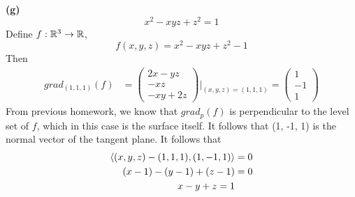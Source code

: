 \documentclass[a4paper, 12pt]{article}
\begin{document}
\begin{solution}
    \textbf{(g)}
    \[
        x^2 - xyz + z^2 = 1
    \]
    Define $f: \mathbb{R}^3 \to \mathbb{R}$, \[
        f(x, y, z) = x^2 - xyz + z^2 - 1
    \]
    Then \begin{align*}
        grad_{(1, 1, 1)}(f) & = \begin{pmatrix}
                                    2x - yz \\
                                    -xz     \\
                                    -xy + 2z
                                \end{pmatrix}\bigg|_{(x, y, z) = (1, 1, 1)} = \begin{pmatrix}
                                                                                  1  \\
                                                                                  -1 \\
                                                                                  1
                                                                              \end{pmatrix}
    \end{align*}
    From previous homework, we know that $grad_p(f)$ is perpendicular to the level set of $f$, which in this case is the surface itself. It follows that (1, -1, 1) is the normal vector of the tangent plane. It follows that \begin{align*}
        \langle (x, y, z) - (1, 1, 1), (1, -1, 1) \rangle & = 0 \\
        (x-1) - (y-1) + (z-1)                     & = 0 \\
        x-y+z = 1
    \end{align*}
\end{solution}
\end{document}

